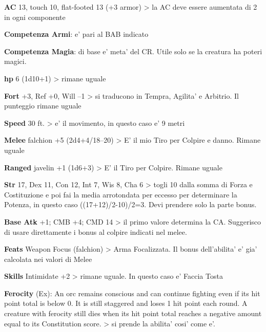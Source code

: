 \documentclass[a4paper,11pt,twoside,openany]{book}
\begin{document}
{\textbf{AC} 13, touch 10, flat-footed 13 (+3 armor) \textgreater{} la AC deve essere aumentata di 2 in ogni componente

\textbf{Competenza Armi}: e' pari al BAB indicato

\textbf{Competenza Magia}: di base e' meta' del CR. Utile solo se la creatura ha poteri magici.

\textbf{hp} 6 (1d10+1) \textgreater{} rimane uguale

\textbf{Fort} +3, Ref +0, Will --1 \textgreater{} si traducono in Tempra, Agilita' e Arbitrio. Il punteggio rimane uguale

\textbf{Speed} 30 ft. \textgreater{} e' il movimento, in questo
caso e' 9 metri

\textbf{Melee} falchion +5 (2d4+4/18--20) \textgreater{} E' il mio Tiro per Colpire e danno. Rimane uguale

\textbf{Ranged} javelin +1 (1d6+3) \textgreater{} E' il Tiro per Colpire. Rimane uguale

\textbf{Str} 17, Dex 11, Con 12, Int 7, Wis 8, Cha 6 \textgreater{} togli 10 dalla somma di Forza e Costituzione e poi fai la media arrotondata per eccesso per determinare la Potenza, in questo caso ((17+12)/2-10)/2=3. Devi prendere solo la parte bonus.

\textbf{Base Atk} +1; CMB +4; CMD 14 \textgreater{} il primo valore determina la CA. Suggerisco di usare direttamente i bonus al colpire indicati nel melee. 

\textbf{Feats} Weapon Focus (falchion) \textgreater{} Arma Focalizzata. Il bonus dell'abilita' e' gia' calcolata nei valori di Melee

\textbf{Skills} Intimidate +2 \textgreater{} rimane uguale. In questo caso e' Faccia Tosta

\textbf{Ferocity} (Ex): An orc remains conscious and can continue fighting even if its hit point total is below 0. It is still staggered and loses 1 hit point each round. A creature with ferocity still dies when its hit point total reaches a negative amount equal to its Constitution score. \textgreater{} si prende la abilita' cosi' come e'.

\pagebreak

\twocolumn

\printindex{}

\pagebreak

\onecolumn


\label{indice-analitico}

\pagebreak

}
\end{document}
